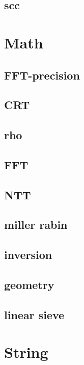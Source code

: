 \subsection{scc}


\section{Math}
\subsection{FFT-precision}

\subsection{CRT}

\subsection{rho}

\subsection{FFT}

\subsection{NTT}

\subsection{miller rabin}

\subsection{inversion}

\subsection{geometry}

\subsection{linear sieve}


\section{String}
